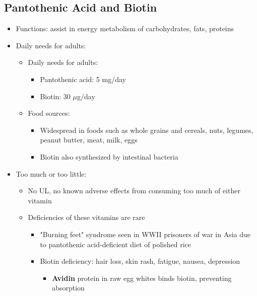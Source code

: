 \documentclass[12pt]{article}
\begin{document}
        \subsection{Pantothenic Acid and Biotin}
            \begin{itemize}
                \item Functions: assist in energy metabolism of carbohydrates, fats, proteins
                \item Daily needs for adults:
                    \begin{itemize}
                        \item Daily needs for adults:
                            \begin{itemize}
                                \item Pantothenic acid: 5 mg/day
                                \item Biotin: 30 $\mu$g/day
                            \end{itemize}
                        \item Food sources:
                            \begin{itemize}
                                \item Widespread in foods such as whole grains and cereals, nuts, legumes, peanut butter, meat, milk, eggs
                                \item Biotin also synthesized by intestinal bacteria
                            \end{itemize}
                    \end{itemize}
                \item Too much or too little:
                    \begin{itemize}
                        \item No UL, no known adverse effects from consuming too much of either vitamin
                        \item Deficiencies of these vitamins are rare
                            \begin{itemize}
                                \item "Burning feet" syndrome seen in WWII prisoners of war in Asia due to pantothenic acid-deficient diet of polished rice
                                \item Biotin deficiency: hair loss, skin rash, fatigue, nausea, depression
                                    \begin{itemize}
                                        \item \textbf{Avidin} protein in raw egg whites binds biotin, preventing absorption
                                    \end{itemize}
                            \end{itemize}
                    \end{itemize}
            \end{itemize}
\end{document}
